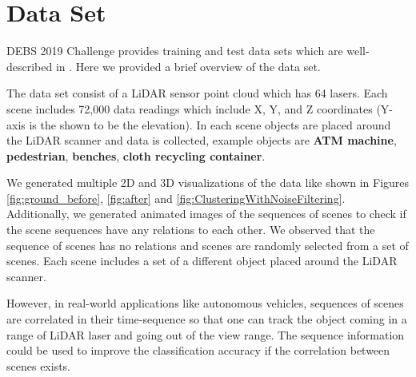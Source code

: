 \section{Data Set}
DEBS 2019  Challenge provides training and test data sets which are well-described in \cite{DEBSGC2019}. 
Here we provided a brief overview of the data set. 
 
The data set consist of a LiDAR sensor point cloud which has 64 lasers. Each scene includes 72,000 data readings which include X, Y, and Z coordinates (Y-axis is the shown to be the elevation).
In each scene objects are placed around the LiDAR scanner and data is collected, example objects are \textbf{ATM machine}, \textbf{pedestrian}, \textbf{benches}, \textbf{cloth recycling container}.

We generated multiple 2D and 3D visualizations of the data like shown in Figures \ref{fig:ground_before},  \ref{fig:after} and \ref{fig:ClusteringWithNoiseFiltering}.
Additionally, we generated animated images of the sequences of scenes to check if the scene sequences have any relations to each other.
We observed that the sequence of scenes has no relations and scenes are randomly selected from a set of scenes. Each scene includes a set of a different object placed around the LiDAR scanner.  

However, in real-world applications like autonomous vehicles, sequences of scenes are correlated in their time-sequence so that one can track the object coming in a range of LiDAR laser and going out of the view range.
The sequence information could be used to improve the classification accuracy if the correlation between scenes exists.



%


